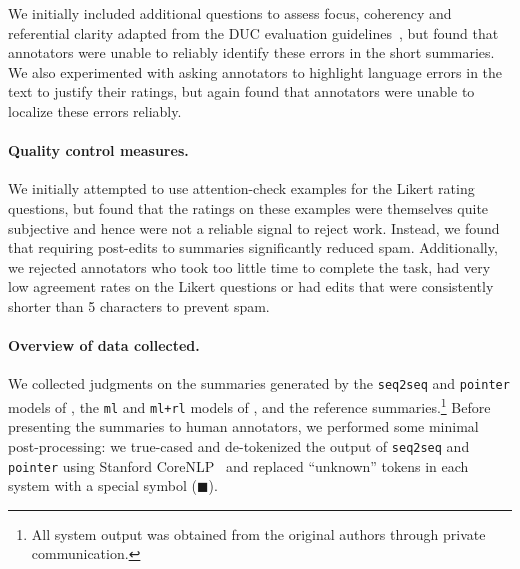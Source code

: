 We initially included additional questions to assess focus, coherency and referential clarity adapted from the DUC evaluation guidelines~\citep{dang2006overview}, but found that annotators were unable to reliably identify these errors in the short summaries.
We also experimented with asking annotators to highlight language errors in the text to justify their ratings, but again found that annotators were unable to localize these errors reliably.

\paragraph{Quality control measures.}

We initially attempted to use attention-check examples for the Likert rating questions, but found that the ratings on these examples were themselves quite subjective and hence were not a reliable signal to reject work.
Instead, we found that requiring post-edits to summaries significantly reduced spam.
Additionally, we rejected annotators who took too little time to complete the task, had very low agreement rates on the Likert questions or had edits that were consistently shorter than 5 characters to prevent spam.


\paragraph{Overview of data collected.}
We collected judgments on the summaries generated by the \texttt{seq2seq} and \texttt{pointer} models of \citet{see2017point}, the \texttt{ml} and \texttt{ml+rl} models of \citet{paulus2018deep}, and the reference summaries.\footnote{%
All system output was obtained from the original authors through private communication.} 
Before presenting the summaries to human annotators, we performed some minimal post-processing: we true-cased and de-tokenized the output of \texttt{seq2seq} and \texttt{pointer} using Stanford CoreNLP~\citep{manning2014stanford} and replaced ``unknown'' tokens in each system with a special symbol ($\blacksquare$).




